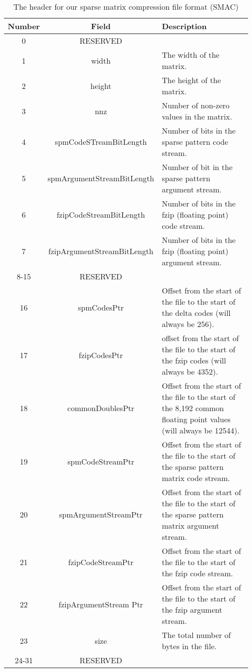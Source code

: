 \begin{table}
    \centering
    \caption{The header for our sparse matrix compression file format (SMAC)}
    \label{tbl:header}
    \begin{tabular}{|ccm{6cm}|}
        \hline
        Number & Field & Description\\
        \hline
        0 & RESERVED & \\
        \hline
        1 & width & The width of the matrix.\\
        \hline
        2 & height & The height of the matrix.\\
        \hline
        3 & nnz & Number of non-zero values in the matrix.\\
        \hline
        4 & spmCodeSTreamBitLength & Number of bits in the sparse pattern code stream.\\
        \hline
        5 & spmArgumentStreamBitLength & Number of bit in the sparse pattern argument stream.\\
        \hline
        6 & fzipCodeStreamBitLength & Number of bits in the fzip (floating point) code stream.\\
        \hline
        7 & fzipArgumentStreamBitLength & Number of bits in the fzip (floating point) argument stream.\\
        \hline
        8-15 & RESERVED & \\
        \hline
        16 & spmCodesPtr & Offset from the start of the file to the start of the delta codes (will always be 256).\\
        \hline
        17 & fzipCodesPtr & offset from the start of the file to the start of the fzip codes (will always be 4352).\\
        \hline
        18 & commonDoublesPtr & Offset from the start of the file to the start of the 8,192 common floating point values (will always be 12544).\\
        \hline
        19 & spmCodeStreamPtr & Offset from the start of the file to the start of the sparse pattern matrix code stream.\\
        \hline
        20 & spmArgumentStreamPtr & Offset from the start of the file to the start of the sparse pattern matrix argument stream.\\
        \hline
        21 & fzipCodeStreamPtr & Offset from the start of the file to the start of the fzip code stream.\\
        \hline
        22 & fzipArgumentStream Ptr & Offset from the start of the file to the start of the fzip argument stream.\\
        \hline
        23 & size & The total number of bytes in the file. \\
        \hline
        24-31 & RESERVED & \\
        \hline
    \end{tabular}
\end{table}

